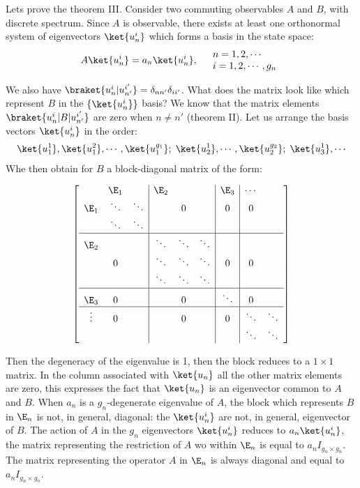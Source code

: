 Lets prove the theorem III.
Consider two commuting observables $A$ and $B$, with discrete spectrum. Since $A$ is observable, there exists at least one orthonormal system of eigenvectors $\ket{u_n^i}$ which forms a 
basis in the state space:
\begin{align}
    A\ket{u_n^i}=a_n\ket{u_n^i},\quad\begin{array}{l}
        n=1,2,\cdots\\
        i=1,2,\cdots,g_n
    \end{array}
\end{align} 

We also have $\braket{u_n^i|u_{n'}^{i'}}=\delta_{nn'}\delta_{ii'}$. What does the matrix look like which represent $B$ in the $\{\ket{u_n^i}\}$ basis?
We know that the matrix elements $\braket{u_n^i|B|u_{n'}^{i'}}$ are zero when $n\neq n'$ (theorem II). Let us arrange the basis vectors $\ket{u_n^i}$ in the order:
\begin{align*}
    \ket{u_1^1},\ket{u_1^2},\cdots,\ket{u_1^{g_1}};\;\ket{u_2^1},\cdots,\ket{u_2^{g_2}};\;\ket{u_3^1},\cdots
\end{align*}
Whe then obtain for $B$ a block-diagonal matrix of the form:

\begin{align}
    \left[
        \begin{array}{ccc|ccc|c|cc}
        &\E_1&&\E_2&&&\E_3&\cdots&\\
        \E_1&\ddots&\ddots&&0&&0&0&\\
        &\ddots&\ddots&&&&&&\\
        \hline
        \E_2&&&\ddots&\ddots&\ddots&&&\\
        &0&&\ddots&\ddots&\ddots&0&0&\\
        &&&\ddots&\ddots&\ddots&&&\\
        \hline
        \E_3&0&&&0&&\ddots&0&\\
        \hline
        \vdots&0&&&0&&0&\ddots&\ddots\\
        &&&&&&&\ddots&\ddots
    \end{array}\right]
\end{align}

Then the degeneracy of the eigenvalue is 1, then the block reduces to a $1\times1$ matrix. In the column associated with $\ket{u_n}$ all the other matrix 
elements are zero, this expresses the fact that $\ket{u_n}$ is an eigenvector common to $A$ and $B$.
When $a_n$ is a $g_n$-degenerate eigenvalue of $A$, the block which represents $B$ in $\E_n$ is not, in general, diagonal: the $\ket{u_n^i}$ are not, in general, eigenvector of $B$.
The action of $A$ in the $g_n$ eigenvectors $\ket{u_n^i}$ reduces to $a_n\ket{u_n^i}$, the matrix representing the restriction of $A$ wo within $\E_n$ is equal to $a_nI_{g_n\times g_n}$.
The matrix representing the operator $A$ in $\E_n$ is always diagonal and equal to $a_nI_{g_n\times g_n}$. 


